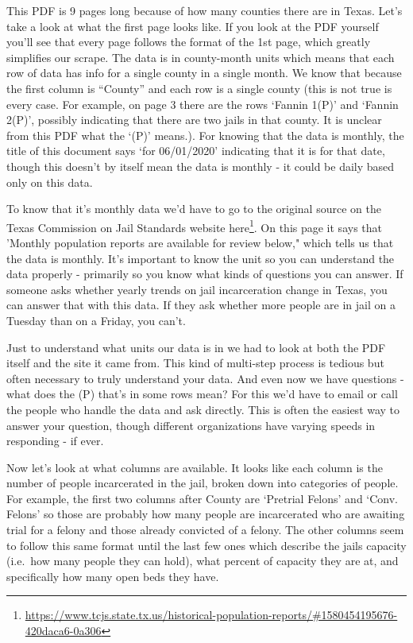 \documentclass[
]{krantz}
\renewcommand{\href}[2]{#2\footnote{\url{#1}}}
\begin{document}
This PDF is 9 pages long because of how many counties there are in Texas. Let's take a look at what the first page looks like. If you look at the PDF yourself you'll see that every page follows the format of the 1st page, which greatly simplifies our scrape. The data is in county-month units which means that each row of data has info for a single county in a single month. We know that because the first column is ``County'' and each row is a single county (this is not true is every case. For example, on page 3 there are the rows `Fannin 1(P)' and `Fannin 2(P)', possibly indicating that there are two jails in that county. It is unclear from this PDF what the `(P)' means.). For knowing that the data is monthly, the title of this document says `for 06/01/2020' indicating that it is for that date, though this doesn't by itself mean the data is monthly - it could be daily based only on this data.

To know that it's monthly data we'd have to go to the original source on the Texas Commission on Jail Standards website \href{https://www.tcjs.state.tx.us/historical-population-reports/\#1580454195676-420daca6-0a306}{here}. On this page it says that 'Monthly population reports are available for review below," which tells us that the data is monthly. It's important to know the unit so you can understand the data properly - primarily so you know what kinds of questions you can answer. If someone asks whether yearly trends on jail incarceration change in Texas, you can answer that with this data. If they ask whether more people are in jail on a Tuesday than on a Friday, you can't.

Just to understand what units our data is in we had to look at both the PDF itself and the site it came from. This kind of multi-step process is tedious but often necessary to truly understand your data. And even now we have questions - what does the (P) that's in some rows mean? For this we'd have to email or call the people who handle the data and ask directly. This is often the easiest way to answer your question, though different organizations have varying speeds in responding - if ever.

Now let's look at what columns are available. It looks like each column is the number of people incarcerated in the jail, broken down into categories of people. For example, the first two columns after County are `Pretrial Felons' and `Conv. Felons' so those are probably how many people are incarcerated who are awaiting trial for a felony and those already convicted of a felony. The other columns seem to follow this same format until the last few ones which describe the jails capacity (i.e.~how many people they can hold), what percent of capacity they are at, and specifically how many open beds they have.
\end{document}
